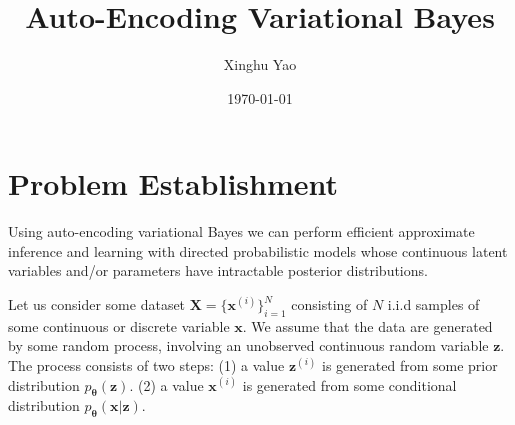 \documentclass{article}
\title{Auto-Encoding Variational Bayes}
\author{Xinghu Yao}
\date{\today}
\begin{document}
	\maketitle
	\section{Problem Establishment}
	Using auto-encoding variational Bayes we can perform efficient approximate inference and learning with directed probabilistic models whose continuous latent variables and/or parameters have intractable posterior distributions.
	
	Let us consider some dataset $\mathbf{X}= \{\mathbf{x}^{(i)}\}_{i=1}^N$ consisting of $N$ i.i.d samples of some continuous or discrete variable $\mathbf{x}$. We assume that the data are generated by some random process, involving an unobserved continuous random variable $\mathbf{z}$. The process consists of two steps: (1) a value $\mathbf{z}^{(i)}$ is generated from some prior distribution $p_{\boldsymbol{\theta}}(\mathbf{z})$. (2) a value $\mathbf{x}^{(i)}$ is generated from some conditional distribution $p_{\boldsymbol{\theta}}(\mathbf{x}|\mathbf{z})$.
	
\end{document}

